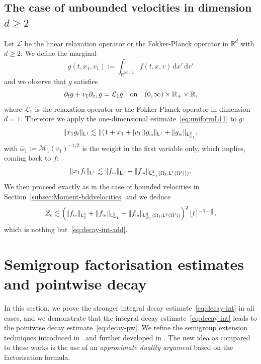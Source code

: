 \documentclass[11pt]{amsart}
\theoremstyle{definition}
\theoremstyle{remark}
\numberwithin{equation}{section}
\newcommand\R{{\mathbb R}}
\def\LL{{\mathcal L}}
\def\ZZ{{\mathcal Z}}
\def\MMM{{\mathscr M}}
\newcommand{\dd}{{\, \mathrm d}}
\newcommand{\init}{\text{{\tiny {\rm in}}}}
\newcommand{\sfL}{\mathsf{L}}
\newcommand{\wangle}[1]{\lfloor #1 \rceil}
\begin{document}
\subsection{The case of unbounded velocities in  dimension $d \ge 2$} \label{subsec:Moment-unbddvelocities}

Let $\mathcal L$ be the linear relaxation operator or the Fokker-Planck operator in $\R^d$ with $d \ge 2$. We define the marginal
\begin{equation}
  \label{eq:def-marginal}
  g (t,x_1,v_1) := \int_{\R^{2d-2}} f(t,x,v) \dd x'\dd v'
\end{equation}
and we observe that $g$ satisfies
\begin{equation*}
  \partial_t g + v_1 \partial_{x_1} g = \LL_1 g \quad \hbox{on}\quad (0,\infty) \times \R_+ \times \R,
\end{equation*}
where $\LL_1$ is the relaxation operator or the Fokker-Planck operator in dimension $d=1$. Therefore we apply the one-dimensional estimate~\eqref{eq:uniformL11} to $g$:
\begin{equation*}
  \| x_1 g_t \|_{\sfL^{1}} 
  \lesssim \| (1+ x_1 + |v_1|) g_{\init} \|_{\sfL^{1}} +  \| g_{\init} \|_{\sfL^{2}_{\bar \omega_1}},
\end{equation*}
with $\bar \omega_1 := \MMM_1(v_1)^{-1/2}$ is the weight in the first variable only, which implies, coming back to $f$:
\begin{equation}
  \label{eq:uniformL11g}
  \| x_1 f_t \|_{\sfL^{1}} 
  \lesssim \| f_{\init} \|_{\sfL^{1}_1} +  \| f_{\init} \|_{\sfL^{2}_{\bar \omega_1}(\Omega_1; \sfL^{1}(\Omega')))}.
\end{equation}
We then proceed exactly as in the case of bounded velocities in Section~\ref{subsec:Moment-bddvelocities} and we deduce
\begin{equation*}
  \ZZ_t \lesssim \left( \| f_{\init} \|_{\sfL^{1}_{1}}  +  \| f_{\init} \|_{\sfL^{2}_{\omega_1}} +  \| f_{\init} \|_{\sfL^{2}_{\bar \omega_1}(\Omega_1; \sfL^{1}(\Omega'))} 
  \right)^{2} \wangle{t}^{-1-\frac{d}2}.
\end{equation*}
which is nothing but~\eqref{eq:decay-int-add}.

\section{Semigroup factorisation estimates and pointwise decay}
\label{sec:kin-pw}

In this section, we prove the stronger integral decay estimate~\eqref{eq:decay-int} in all cases, and we demonstrate that the integral decay estimate~\eqref{eq:decay-int} leads to the pointwise decay estimate~\eqref{eq:decay-pw}. We refine the semigroup extension techniques introduced in~\cite{MR3779780} and further developed in \cite{MisMou,MR3489637,MR3465438,MR4265692}. The new idea as compared to these works is the use of an \emph{approximate duality argument} based on the factorisation formula.
\end{document}
